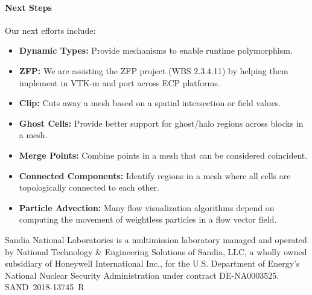 \paragraph{Next Steps}
Our next efforts include:

\begin{itemize}
\item \textbf{Dynamic Types:}
  Provide mechanisms to enable runtime polymorphism.
\item \textbf{ZFP:}
  We are assisting the ZFP project (WBS 2.3.4.11) by helping them implement {\zfp} in VTK-m and port across ECP platforms.
\item \textbf{Clip:}
  Cuts away a mesh based on a spatial intersection or field values.
\item \textbf{Ghost Cells:}
  Provide better support for ghost/halo regions across blocks in a mesh.
\item \textbf{Merge Points:}
  Combine points in a mesh that can be considered coincident.
\item \textbf{Connected Components:}
  Identify regions in a mesh where all cells are topologically connected to each other.
\item \textbf{Particle Advection:}
  Many flow visualization algorithms depend on computing the movement of weightless particles in a flow vector field.
\end{itemize}

\noindent
{\tiny Sandia National Laboratories is a multimission laboratory managed and operated by National Technology \& Engineering Solutions of Sandia, LLC, a wholly owned subsidiary of Honeywell International Inc., for the U.S. Department of Energy's National Nuclear Security Administration under contract DE-NA0003525. \hfill SAND~2018-13745~R
\par}
